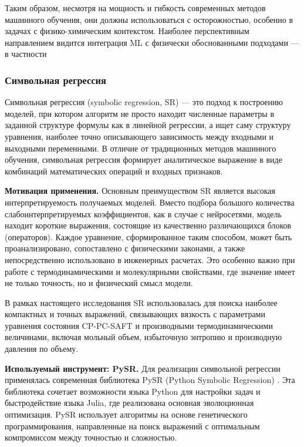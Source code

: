 \documentclass[a4paper,12pt]{article}
\begin{document}
Таким образом, несмотря на мощность и гибкость современных методов машинного обучения, они должны использоваться с осторожностью, особенно в задачах с физико-химическим контекстом. Наиболее перспективным направлением видится интеграция ML с физически обоснованными подходами — в частности

\subsubsection{Символьная регрессия}

Символьная регрессия (symbolic regression, SR) — это подход к построению моделей, при котором алгоритм не просто находит численные параметры в заданной структуре формулы как в линейной регрессии, а ищет саму структуру уравнения, наиболее точно описывающего зависимость между входными и выходными переменными. В отличие от традиционных методов машинного обучения, символьная регрессия формирует аналитическое выражение в виде комбинаций математических операций и входных признаков.

\textbf{Мотивация применения.}
Основным преимуществом SR является высокая интерпретируемость получаемых моделей. Вместо подбора большого количества слабоинтерпретируемых коэффициентов, как в случае с нейросетями, модель находит короткие выражения, состоящие из качественно различающихся блоков (операторов). Каждое уравнение, сформированное таким способом, может быть проанализировано, сопоставлено с физическими законами, а также непосредственно использовано в инженерных расчетах. Это особенно важно при работе с термодинамическими и молекулярными свойствами, где значение имеет не только точность, но и физический смысл модели.

В рамках настоящего исследования SR использовалась для поиска наиболее компактных и точных выражений, связывающих вязкость с параметрами уравнения состояния CP-PC-SAFT и производными термодинамическими величинами, включая мольный объем, избыточную энтропию и производную давления по объему.

\textbf{Используемый инструмент: PySR.}
Для реализации символьной регрессии применялась современная библиотека PySR (Python Symbolic Regression) \cite{cranmer2023pysr}. Эта библиотека сочетает возможности языка Python для настройки задач и быстродействие языка Julia, где реализована основная эволюционная оптимизация. PySR использует алгоритмы на основе генетического программирования, направленные на поиск выражений с оптимальным компромиссом между точностью и сложностью.
\end{document}
